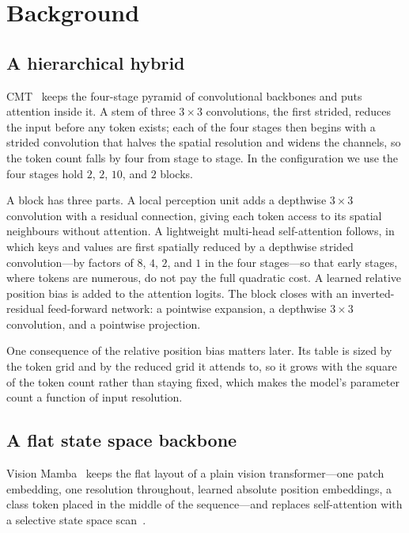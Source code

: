 \section{Background}
\label{sec:background}

\subsection{A hierarchical hybrid}

CMT~\citep{guo2022cmt} keeps the four-stage pyramid of convolutional
backbones and puts attention inside it. A stem of three $3\times3$
convolutions, the first strided, reduces the input before any token exists;
each of the four stages then begins with a strided convolution that halves
the spatial resolution and widens the channels, so the token count falls by
four from stage to stage. In the configuration we use the four stages hold
$2$, $2$, $10$, and $2$ blocks.

A block has three parts. A local perception unit adds a depthwise $3\times3$
convolution with a residual connection, giving each token access to its
spatial neighbours without attention. A lightweight multi-head self-attention
follows, in which keys and values are first spatially reduced by a depthwise
strided convolution---by factors of $8$, $4$, $2$, and $1$ in the four
stages---so that early stages, where tokens are numerous, do not pay the full
quadratic cost. A learned relative position bias is added to the attention
logits. The block closes with an inverted-residual feed-forward network: a
pointwise expansion, a depthwise $3\times3$ convolution, and a pointwise
projection.

One consequence of the relative position bias matters later. Its table is
sized by the token grid and by the reduced grid it attends to, so it grows
with the square of the token count rather than staying fixed, which makes the
model's parameter count a function of input resolution.

\subsection{A flat state space backbone}

Vision Mamba~\citep{zhu2024vim} keeps the flat layout of a plain vision
transformer---one patch embedding, one resolution throughout, learned
absolute position embeddings, a class token placed in the middle of the
sequence---and replaces self-attention with a selective state space
scan~\citep{gu2023mamba}.

